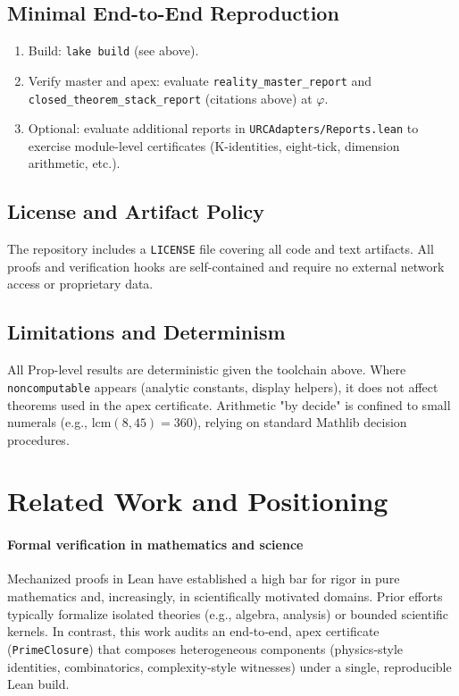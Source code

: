 \documentclass{article}
\begin{document}
\subsection{Minimal End-to-End Reproduction}
\begin{enumerate}[leftmargin=*]
  \item Build: \texttt{lake build} (see above).
  \item Verify master and apex: evaluate \texttt{reality\_master\_report} and \texttt{closed\_theorem\_stack\_report} (citations above) at \(\varphi\).
  \item Optional: evaluate additional reports in \texttt{URCAdapters/Reports.lean} to exercise module-level certificates (K-identities, eight‑tick, dimension arithmetic, etc.).
\end{enumerate}

\subsection{License and Artifact Policy}
The repository includes a \texttt{LICENSE} file covering all code and text artifacts. All proofs and verification hooks are self-contained and require no external network access or proprietary data.

\subsection{Limitations and Determinism}
All Prop-level results are deterministic given the toolchain above. Where \texttt{noncomputable} appears (analytic constants, display helpers), it does not affect theorems used in the apex certificate. Arithmetic "by decide" is confined to small numerals (e.g., \(\mathrm{lcm}(8,45)=360\)), relying on standard Mathlib decision procedures.

\section{Related Work and Positioning}
\paragraph{Formal verification in mathematics and science} Mechanized proofs in Lean have established a high bar for rigor in pure mathematics and, increasingly, in scientifically motivated domains. Prior efforts typically formalize isolated theories (e.g., algebra, analysis) or bounded scientific kernels. In contrast, this work audits an end‑to‑end, apex certificate (\texttt{PrimeClosure}) that composes heterogeneous components (physics‑style identities, combinatorics, complexity‑style witnesses) under a single, reproducible Lean build.
\end{document}
